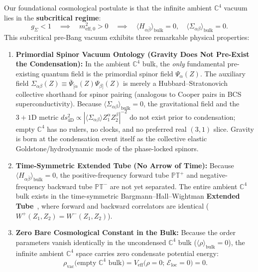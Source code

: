 \documentclass[11pt,a4paper]{article}
\begin{document}
Our foundational cosmological postulate is that the infinite ambient $\mathbb{C}^4$ vacuum lies in the \textbf{subcritical regime}:
\begin{equation}
g_\Sigma < 1 \quad \implies \quad m_{\text{eff},0}^2 > 0 \quad \implies \quad \langle H_{\alpha\bar{\beta}} \rangle_{\text{bulk}} = 0, \quad \langle \Sigma_{\alpha\beta} \rangle_{\text{bulk}} = 0.
\end{equation}
This subcritical pre-Bang vacuum exhibits three remarkable physical properties:
\begin{enumerate}
    \item \textbf{Primordial Spinor Vacuum Ontology (Gravity Does Not Pre-Exist the Condensation):} In the ambient $\mathbb{C}^4$ bulk, the \emph{only} fundamental pre-existing quantum field is the primordial spinor field $\Psi_\alpha(Z)$. The auxiliary field $\Sigma_{\alpha\beta}(Z) \equiv \bar{\Psi}_{[\alpha}(Z)\Psi_{\beta]}(Z)$ is merely a Hubbard--Stratonovich collective shorthand for spinor pairing (analogous to Cooper pairs in BCS superconductivity). Because $\langle \Sigma_{\alpha\beta} \rangle_{\text{bulk}} = 0$, the gravitational field and the $3+1\text{D}$ metric $ds_{4\text{D}}^2 \propto |\langle\Sigma_{\alpha\beta}\rangle Z_1^\alpha Z_2^\beta|^{-2}$ do not exist prior to condensation; empty $\mathbb{C}^4$ has no rulers, no clocks, and no preferred real $(3,1)$ slice. Gravity is born at the condensation event itself as the collective elastic Goldstone/hydrodynamic mode of the phase-locked spinors.
    \item \textbf{Time-Symmetric Extended Tube (No Arrow of Time):} Because $\langle H_{\alpha\bar{\beta}} \rangle_{\text{bulk}} = 0$, the positive-frequency forward tube $\mathbb{PT}^+$ and negative-frequency backward tube $\mathbb{PT}^-$ are not yet separated. The entire ambient $\mathbb{C}^4$ bulk exists in the time-symmetric Bargmann--Hall--Wightman \textbf{Extended Tube}~\cite{StreaterWightman1964}, where forward and backward correlators are identical ($W^+(Z_1, Z_2) = W^-(Z_1, Z_2)$).
    \item \textbf{Zero Bare Cosmological Constant in the Bulk:} Because the order parameters vanish identically in the uncondensed $\mathbb{C}^4$ bulk ($\langle\rho\rangle_{\text{bulk}} = 0$), the infinite ambient $\mathbb{C}^4$ space carries zero condensate potential energy:
    \begin{equation}
    \rho_{\text{vac}}\big(\text{empty }\mathbb{C}^4\text{ bulk}\big) = V_{\text{eff}}\big(\rho = 0;\, \mathcal{E}_{\text{loc}} = 0\big) = 0.
    \end{equation}
\end{enumerate}
\end{document}
